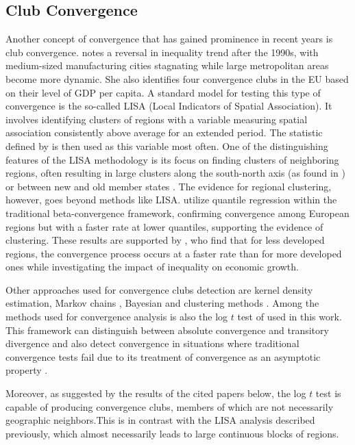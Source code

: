 \documentclass[11pt]{article}
\begin{document}
\subsection{Club Convergence} 
 Another concept of convergence that has gained prominence in recent years is club convergence. \citet{iammarino2017regional} notes a reversal in inequality trend after the 1990s, with medium-sized manufacturing cities stagnating while large metropolitan areas become more dynamic. She also identifies four convergence clubs in the EU based on their level of GDP per capita. A standard model for testing this type of convergence is the so-called LISA (Local Indicators of Spatial Association). It involves identifying clusters of regions with a variable measuring spatial association consistently above average for an extended period. The statistic defined by \citet{getis1992analysis} is then used as this variable most often. One of the distinguishing features of the LISA methodology is its focus on finding clusters of neighboring regions, often resulting in large clusters along the south-north axis (as found in \citet{baumont2003spatial}) or between new and old member states \citep{eckey2007convergence}. The evidence for regional clustering, however, goes beyond methods like LISA. \citet{cartone2021does} utilize quantile regression within the traditional beta-convergence framework, confirming convergence among European regions but with a faster rate at lower quantiles, supporting the evidence of clustering. These results are supported by \citet{panzera2022impact}, who find that for less developed regions, the convergence process occurs at a faster rate than for more developed ones while investigating the impact of inequality on economic growth.

 
Other approaches used for convergence clubs detection are kernel density estimation, Markov chains \citep{eckey2007convergence}, Bayesian \citep{fischer2015bayesian} and clustering methods \citep{maasoumi2008economic}. Among the methods used for convergence analysis is also the log $t$ test of \citet{phillips2007transition} used in this work. This framework can distinguish between absolute convergence and transitory divergence and also detect convergence in situations where traditional convergence tests fail due to its treatment of convergence as an asymptotic property \citep{bartkowska2012regional, borsi2015evolution}.

Moreover, as suggested by the results of the cited papers below, the log $t$ test is capable of producing convergence clubs, members of which are not necessarily geographic neighbors.This is in contrast with the LISA analysis described previously, which almost necessarily leads to large continuous blocks of regions.
\end{document}
